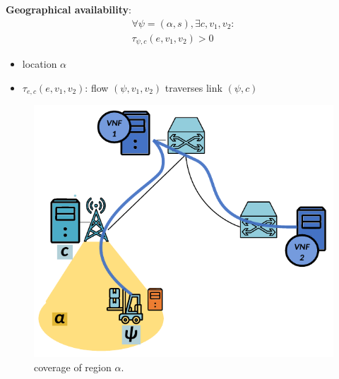 \documentclass[aspectratio=169]{beamer}
\begin{document}
\begin{frame}
    \frametitle{\secname}
    \framesubtitle{\subsecname}

    \begin{minipage}{0.43\textwidth}
        \textbf{Geographical availability}:
        \begin{multline}
            \forall\psi = (\alpha, s), \exists c, v_1 , v_2:\\
            \tau_{\psi,c} (e, v_1 , v_2 ) > 0
            \label{eq:okpi-geo-constraint}
        \end{multline}
        \begin{itemize}
            \item location $\alpha$
            \item $\tau_{e,c} (e, v_1 , v_2 )$: flow $(\psi, v_1 , v_2 )$ traverses link $(\psi, c)$
        \end{itemize}
    \end{minipage}
    \begin{minipage}{0.55\textwidth}
        \begin{figure}
            \centering
            \includegraphics[width=.8\textwidth]{img/geographical.pdf}
            \caption{coverage of region $\alpha$.}
        \end{figure}
    \end{minipage}
\end{frame}
\end{document}
